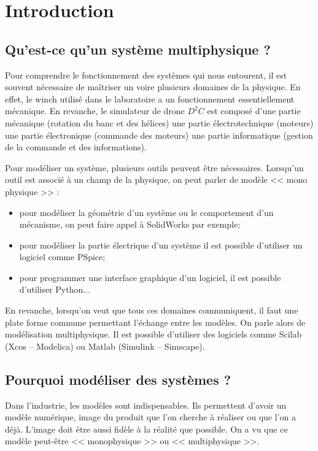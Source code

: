 \section{Introduction}
\subsection{Qu'est-ce qu'un système multiphysique ?}

Pour comprendre le fonctionnement des systèmes qui nous entourent, il est souvent nécessaire de maîtriser un voire plusieurs domaines de la physique. En effet, le winch utilisé dans le laboratoire a un fonctionnement essentiellement mécanique. En revanche, le simulateur de drone $D^2C$ est composé d'une partie mécanique (rotation du banc et des hélices) une partie électrotechnique (moteurs) une partie électronique (commande des moteurs) une partie informatique (gestion de la commande et des informations). 

Pour modéliser un système, plusieurs outils peuvent être nécessaires. Lorsqu'un outil est associé à un champ de la physique, on peut parler de modèle << mono physique >> :
\begin{itemize}
\item pour modéliser la géométrie d'un système ou le comportement d'un mécanisme, on peut faire appel à SolidWorks par exemple;
\item pour modéliser la partie électrique d'un système il est possible d'utiliser un logiciel comme PSpice;
\item pour programmer une interface graphique d'un logiciel, il est possible d'utiliser Python...
\end{itemize}

En revanche, lorsqu'on veut que tous ces domaines communiquent, il faut une plate forme commune permettant l'échange entre les modèles. On parle alors de modélisation multiphysique. Il est possible d'utiliser des logiciels comme Scilab (Xcos -- Modelica) ou Matlab (Simulink -- Simscape). 



\subsection{Pourquoi modéliser des systèmes ?}
Dans l'industrie, les modèles sont indispensables. Ils permettent d'avoir un modèle numérique, image du produit que l'on cherche à réaliser ou que l'on a déjà. L'image doit être aussi fidèle à la réalité que possible. On a vu que ce modèle peut-être << monophysique >> ou << multiphysique >>. 

